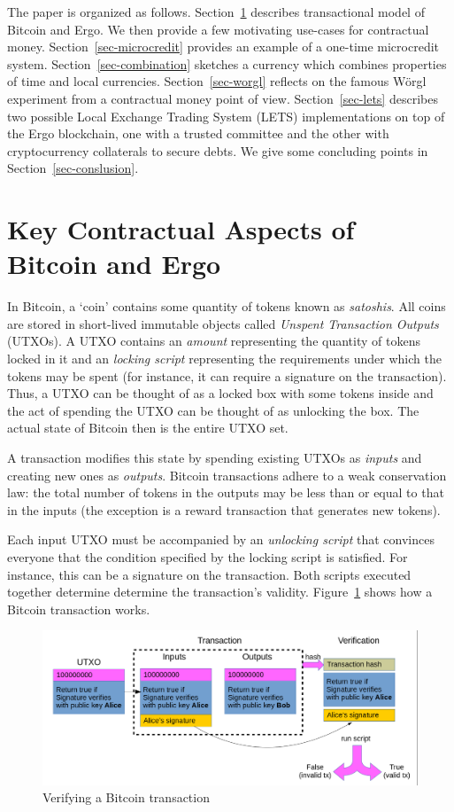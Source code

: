 \documentclass[]{llncs}   %
\begin{document}
The paper is organized as follows. Section~\ref{sec-txmodel} describes transactional model of Bitcoin and Ergo. We then  provide a few motivating use-cases for contractual money. Section~\ref{sec-microcredit} provides an example of a one-time microcredit system. Section~\ref{sec-combination} sketches a currency which combines properties of time and local currencies. Section~\ref{sec-worgl} reflects on the famous W\"{o}rgl experiment from a contractual money point of view. Section~\ref{sec-lets} describes two possible Local Exchange Trading System (LETS) implementations on top of the Ergo blockchain, one with a trusted committee and the other with cryptocurrency collaterals to secure debts. We give some concluding points in Section~\ref{sec-conslusion}.


\section{Key Contractual Aspects of Bitcoin and Ergo}
\label{sec-txmodel}

In Bitcoin, a `coin' contains some quantity of tokens known as {\em satoshis}. All coins are stored in short-lived immutable objects called {\em Unspent Transaction Outputs} (UTXOs). 
A UTXO contains an {\em amount} representing the quantity of tokens locked in it and an {\em locking script} representing the requirements under which the tokens may be spent (for instance, it can require a signature on the transaction). Thus, a UTXO can be thought of as a locked box with some tokens inside and the act of spending the UTXO can be thought of as unlocking the box.
The actual state of Bitcoin then is the entire UTXO set. 

A transaction modifies this state by spending existing UTXOs as {\em inputs} and creating new ones as {\em outputs}. 
Bitcoin transactions adhere to a weak conservation law: the total number of tokens in the outputs may be less than or equal to that in the inputs (the exception is a reward transaction that generates new tokens).

Each input UTXO must be accompanied by an {\em unlocking script} that convinces everyone that the condition specified by the locking script is satisfied. For instance, this can be a signature on the transaction. Both scripts executed together determine determine the transaction's validity.
Figure~\ref{fig1} shows how a Bitcoin transaction works.
\begin{figure}
	\includegraphics[scale=0.24]{bitcoin.png}
	\caption{Verifying a Bitcoin transaction}
	\label{fig1}
\end{figure}
\end{document}
